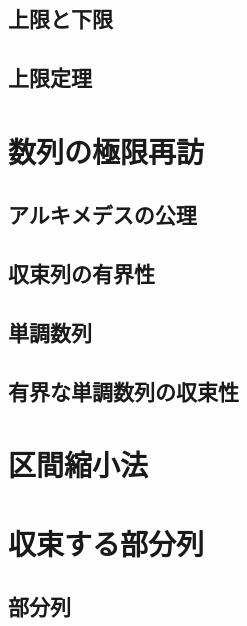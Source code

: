 \documentclass[../imaging-math]{subfiles}
\begin{document}
\subsection{上限と下限}

\subsection{上限定理}


\section{数列の極限再訪}

\subsection{アルキメデスの公理}


\subsection{収束列の有界性}


\subsection{単調数列}


\subsection{有界な単調数列の収束性}


\section{区間縮小法}


\section{収束する部分列}

\subsection{部分列}
\end{document}
